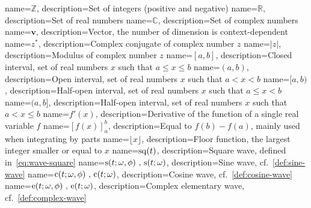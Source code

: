 {
  name={$\mathbb{Z}$},
  description={Set of integers (positive and negative)}
}
{
  name={$\mathbb{R}$},
  description={Set of real numbers}
}
{
  name={$\mathbb{C}$},
  description={Set of complex numbers}
}
{
  name={$\mathbf{v}$},
  description={Vector, the number of dimension is context-dependent}
}
{
  name={$z^*$},
  description={Complex conjugate of complex number $z$}
}
{
  name={$|z|$},
  description={Modulus of complex number $z$}
}
{
  name={$[a,b]$},
  description={Closed interval, \ie set of real numbers $x$ such that $a\leq x \leq b$}
}
{
  name={$(a,b)$},
  description={Open interval, \ie set of real numbers $x$ such that $a< x <b$}
}
{
  name={$[a,b)$},
  description={Half-open interval, \ie set of real numbers $x$ such that $a\leq x <b$}
}
{
  name={$(a,b]$},
  description={Half-open interval, \ie set of real numbers $x$ such that $a< x\leq b$}
}
{
  name={$f'(x)$},
  description={Derivative of the function of a single real variable $f$}
}
{
  name={$\left[f(x)\right]_a^b$},
  description={Equal to $f(b)-f(a)$, mainly used when integrating by parts}
}
{
  name={$\lfloor x\rfloor$},
  description={Floor function, \ie the largest integer smaller or equal to $x$}
}
{
  name={$\mathrm{sq}(t)$},
  description={Square wave, defined in~\cref{eq:wave-square}}
}
{
  name={$\mathrm{s}(t;\omega,\phi)~\text{,}~\mathrm{s}(t;\omega)$},
  description={Sine wave, cf.~\cref{def:sine-wave}}
}
{
  name={$\mathrm{c}(t;\omega,\phi)~\text{,}~\mathrm{c}(t;\omega)$},
  description={Cosine wave, cf.~\cref{def:cosine-wave}}
}
{
  name={$\mathrm{e}(t;\omega,\phi)~\text{,}~\mathrm{e}(t;\omega)$},
  description={Complex elementary wave, cf.~\cref{def:complex-wave}}
}
\makeglossaries

